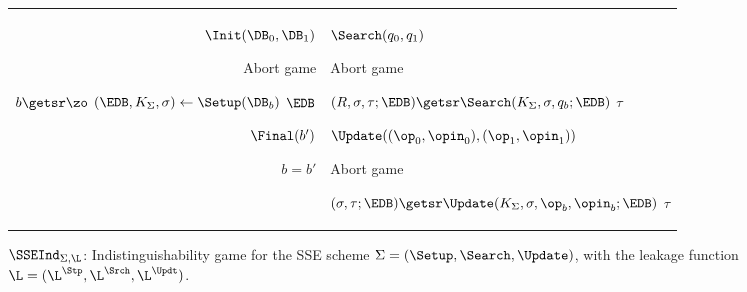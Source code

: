 

	\begin{figure}[ht]
		\begin{tabular}{r|l}
			
			\begin{minipage}[t]{0.42\textwidth}
				\underline{$\Init(\DB_0, \DB_1)$}
				\begin{algorithmic}[0]
					\SmallIf{$\L^\Stp(\DB_0) \neq \L^\Stp(\DB_1)$}
						\State Abort game

					\State $b \getsr \zo$
					\State $(\EDB, K_\Sigma, \sigma) \gets \Setup(\DB_b)$
					\State \Return $\EDB$
				\end{algorithmic}

				\underline{$\Final(b')$}
				\begin{algorithmic}[0]
					\State \Return $b = b'$
				\end{algorithmic}
			\end{minipage}
			&
			\hspace{0.02\textwidth}
			\begin{minipage}[t]{0.49\textwidth}
				\underline{$\Search(q_0, q_1)$}
				\begin{algorithmic}[0]
					\SmallIf{$\L^\Srch(q_0) \neq \L^\Srch(q_1)$}
						\State Abort game

					\State $(R, \sigma, \tau; \EDB) \getsr \Search(K_\Sigma,\sigma,q_b;\EDB)$
					\State \Return $\tau$
				\end{algorithmic}
				
				\underline{$\Update((\op_0,\opin_0),(\op_1,\opin_1))$}
				\begin{algorithmic}[0]
					\SmallIf{$\L^\Updt(\op_0,\opin_0) \neq \L^\Updt(\op_1,\opin_1)$}
						\State Abort game

					\State $(\sigma, \tau; \EDB) \getsr  \Update(K_\Sigma, \sigma,\op_b,\opin_b;\EDB)$
					\State \Return $\tau$
				\end{algorithmic}
				

				
			\end{minipage}
		\end{tabular}
				
		\caption[$\SSEInd_{\Sigma, \L}$: SSE indistinguishability game]{$\SSEInd_{\Sigma, \L}$: Indistinguishability game for the SSE scheme $\Sigma = (\Setup,\allowbreak \Search,\allowbreak \Update)$, with the leakage function $\L = (\L^\Stp, \L^\Srch, \L^\Updt)$.}
		\label{fig:ind_sse_honest}
	\end{figure}
	
